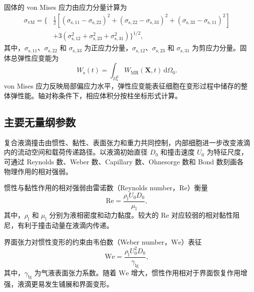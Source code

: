 固体的 von Mises 应力由应力分量计算为
\begin{equation}
\begin{aligned}
\sigma_{\mathrm{vM}}
=
\Bigg\{
&\frac{1}{2}
\left[
\left(\sigma_{\mathrm s,11}-\sigma_{\mathrm s,22}\right)^2
+
\left(\sigma_{\mathrm s,22}-\sigma_{\mathrm s,33}\right)^2
+
\left(\sigma_{\mathrm s,33}-\sigma_{\mathrm s,11}\right)^2
\right]
\\
&+
3\left(
\sigma_{\mathrm s,12}^2+
\sigma_{\mathrm s,23}^2+
\sigma_{\mathrm s,31}^2
\right)
\Bigg\}^{1/2},
\end{aligned}
\label{eq:ch2_von_mises}
\end{equation}
其中，$\sigma_{\mathrm s,11}$、$\sigma_{\mathrm s,22}$ 和 $\sigma_{\mathrm s,33}$ 为正应力分量，$\sigma_{\mathrm s,12}$、$\sigma_{\mathrm s,23}$ 和 $\sigma_{\mathrm s,31}$ 为剪应力分量。固体总弹性应变能为
\begin{equation}
W_{\mathrm s}(t)
=
\int_{\Omega_{\mathrm s}^0}
W_{\mathrm{MR}}(\boldsymbol{X},t)
\,\mathrm d\Omega_0.
\label{eq:ch2_total_strain_energy}
\end{equation}
von Mises 应力反映局部偏应力水平，弹性应变能表征细胞在变形过程中储存的整体弹性能。轴对称条件下，相应体积分按柱坐标形式计算。

\subsection{主要无量纲参数}
\label{subsec:ch2_dimensionless}

复合液滴撞击由惯性、黏性、表面张力和重力共同控制，内部细胞进一步改变液滴内的流动空间和载荷传递路径。以液滴初始直径 $D_0$ 和撞击速度 $U_0$ 为特征尺度，可通过 Reynolds 数、Weber 数、Capillary 数、Ohnesorge 数和 Bond 数刻画各物理作用的相对强弱。

惯性与黏性作用的相对强弱由雷诺数（Reynolds number，$\mathrm{Re}$）衡量
\begin{equation}
\mathrm{Re}
=
\frac{\rho_{\mathrm l}U_0D_0}{\mu_{\mathrm l}},
\label{eq:ch2_re}
\end{equation}
其中，$\rho_{\mathrm l}$ 和 $\mu_{\mathrm l}$ 分别为液相密度和动力黏度。较大的 $\mathrm{Re}$ 对应较弱的相对黏性阻尼，有利于撞击动量在液滴内传递。

界面张力对惯性变形的约束由韦伯数（Weber number，$\mathrm{We}$）表征
\begin{equation}
\mathrm{We}
=
\frac{\rho_{\mathrm l}U_0^2D_0}{\gamma_{\mathrm{lg}}},
\label{eq:ch2_we}
\end{equation}
其中，$\gamma_{\mathrm{lg}}$ 为气液表面张力系数。随着 $\mathrm{We}$ 增大，惯性作用相对于界面恢复作用增强，液滴更易发生铺展和界面变形。

